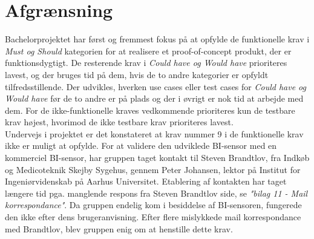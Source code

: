 \chapter{Afgrænsning}
Bachelorprojektet har først og fremmest fokus på at opfylde de funktionelle krav i \textit{Must og Should} kategorien for at realisere et proof-of-concept produkt, der er funktionsdygtigt. De resterende krav i \textit{Could have og Would have} prioriteres lavest, og der bruges tid på dem, hvis de to andre kategorier er opfyldt tilfredsstillende. Der udvikles, hverken use cases eller test cases for \textit{Could have og Would have} før de to andre er på plads og der i øvrigt er nok tid at arbejde med dem. For de ikke-funktionelle kraves vedkommende prioriteres kun de testbare krav højest, hvorimod de ikke testbare krav prioriteres lavest. \\


Undervejs i projektet er det konstateret at krav nummer 9 i de funktionelle krav ikke er muligt at opfylde. For at validere den udviklede BI-sensor med en kommerciel BI-sensor, har gruppen taget kontakt til Steven Brandtlov, fra Indkøb og Medicoteknik Skejby Sygehus, gennem  Peter Johansen, lektor på Institut for Ingeniørvidenskab på Aarhus Universitet. Etablering af kontakten har taget længere tid pga. manglende respons fra Steven Brandtlov side, se \textit{"bilag 11 - Mail korrespondance"}. Da gruppen endelig kom i besiddelse af BI-sensoren,  fungerede den ikke efter dens brugeranvisning. Efter flere mislykkede mail korrespondance med Brandtlov, blev gruppen enig om at henstille dette krav.      